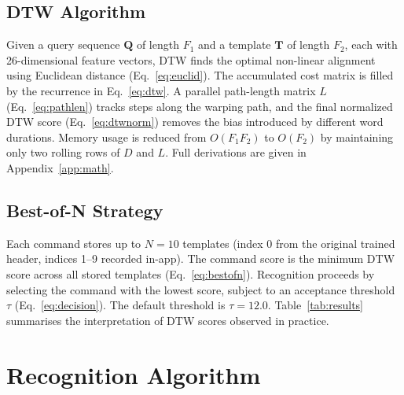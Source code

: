 \documentclass[conference]{IEEEtran}
\begin{document}
\subsection{DTW Algorithm}
Given a query sequence $\mathbf{Q}$ of length $F_1$ and a template
$\mathbf{T}$ of length $F_2$, each with 26-dimensional feature vectors,
DTW finds the optimal non-linear alignment using Euclidean distance
(Eq.~\ref{eq:euclid}). The accumulated cost matrix is filled by the
recurrence in Eq.~\ref{eq:dtw}. A parallel path-length matrix $L$
(Eq.~\ref{eq:pathlen}) tracks steps along the warping path, and the
final normalized DTW score (Eq.~\ref{eq:dtwnorm}) removes the bias
introduced by different word durations. Memory usage is reduced from
$O(F_1 F_2)$ to $O(F_2)$ by maintaining only two rolling rows of
$D$ and $L$. Full derivations are given in Appendix~\ref{app:math}.

\subsection{Best-of-N Strategy}
Each command stores up to $N=10$ templates (index 0 from the original
trained header, indices 1--9 recorded in-app). The command score is the
minimum DTW score across all stored templates (Eq.~\ref{eq:bestofn}).
Recognition proceeds by selecting the command with the lowest score,
subject to an acceptance threshold $\tau$ (Eq.~\ref{eq:decision}).
The default threshold is $\tau = 12.0$. Table~\ref{tab:results}
summarises the interpretation of DTW scores observed in practice.
\section{Recognition Algorithm} \label{sec:recognition}
\end{document}
